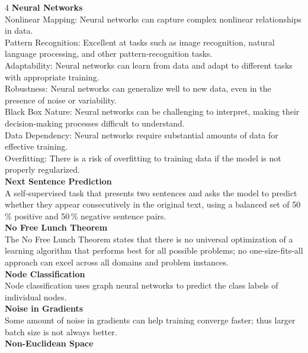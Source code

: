 \documentclass[8pt]{extarticle}
\begin{document}
\begin{multicols}{4}
\vspace{2pt}\textbf{Neural Networks}\\
Nonlinear Mapping: Neural networks can capture complex nonlinear relationships in data.\\
Pattern Recognition: Excellent at tasks such as image recognition, natural language processing, and other pattern‑recognition tasks.\\
Adaptability: Neural networks can learn from data and adapt to different tasks with appropriate training.\\
Robustness: Neural networks can generalize well to new data, even in the presence of noise or variability.\\
Black Box Nature: Neural networks can be challenging to interpret, making their decision‑making processes difficult to understand.\\
Data Dependency: Neural networks require substantial amounts of data for effective training.\\
Overfitting: There is a risk of overfitting to training data if the model is not properly regularized.\\
\vspace{2pt}\textbf{Next Sentence Prediction}\\
A self‑supervised task that presents two sentences and asks the model to predict whether they appear consecutively in the original text, using a balanced set of 50\,\% positive and 50\,\% negative sentence pairs.\\
\vspace{2pt}\textbf{No Free Lunch Theorem}\\
The No Free Lunch Theorem states that there is no universal optimization of a learning algorithm that performs best for all possible problems; no one-size-fits-all approach can excel across all domains and problem instances.\\
\vspace{2pt}\textbf{Node Classification}\\
Node classification uses graph neural networks to predict the class labels of individual nodes.\\
\vspace{2pt}\textbf{Noise in Gradients}\\
Some amount of noise in gradients can help training converge faster; thus larger batch size is not always better.\\
\vspace{2pt}\textbf{Non-Euclidean Space}\\

\end{multicols}
\end{document}
